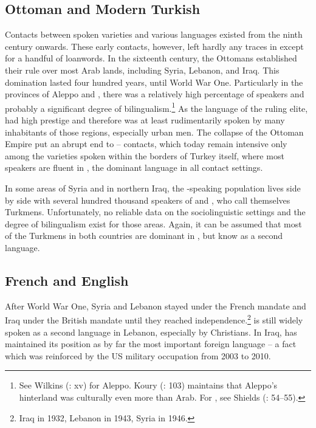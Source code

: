 \documentclass[output=paper]{langsci/langscibook}
\begin{document}
 \subsection{Ottoman and Modern Turkish} 
Contacts between spoken  varieties and various  languages existed from the ninth century onwards. These early contacts, however, left hardly any traces in  except for a handful of {loanwords}. In the sixteenth century, the Ottomans established their rule over most Arab lands, including Syria, Lebanon, and Iraq. This domination lasted four hundred years, until World War One. Particularly in the provinces of Aleppo and , there was a relatively high percentage of  speakers and probably a significant degree of {bilingualism}.\footnote{See Wilkins (\citeyear{Wilkins2010}: xv) for Aleppo. Koury (\citeyear{Khoury1987}: 103) maintains that Aleppo’s hinterland was culturally even more  than Arab. For , see Shields (\citeyear{Shields2004}: 54--55).} As the language of the ruling elite,  had high {prestige} and therefore was at least rudimentarily spoken by many inhabitants of those regions, especially urban men. The collapse of the Ottoman Empire put an abrupt end to -- contacts, which today remain {intensive} only among the  varieties spoken within the borders of Turkey itself, where most  speakers are fluent in , the dominant language in all contact settings.

In some areas of Syria and in northern Iraq, the -speaking population lives side by side with several hundred thousand speakers of  and  , who call themselves Turkmens. Unfortunately, no reliable data on the sociolinguistic settings and the degree of {bilingualism} exist for those areas. Again, it can be assumed that most of the Turkmens in both countries are dominant in , but know  as a second language.

 \subsection{French and English} \label{french}

After World War One, Syria and Lebanon stayed under the French mandate and Iraq under the British mandate until they reached independence.\footnote{Iraq in 1932, Lebanon in 1943, Syria in 1946.}  is still widely spoken as a second language in Lebanon, especially by {Christians}. In Iraq,  has maintained its position as by far the most important foreign language – a fact which was reinforced by the US military occupation from 2003 to 2010. 
\end{document}
